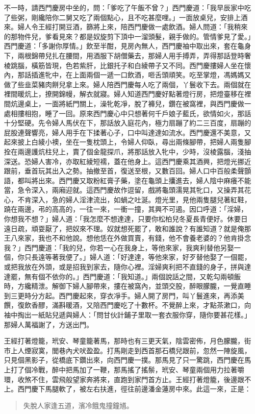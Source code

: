 不一時，請西門慶房中坐的，問：「爹吃了午飯不曾？」西門慶道：「我早辰家中吃了些粥，剛纔陪你二舅又吃了兩個點心，且不吃甚麼哩。」一面放桌兒，安排上酒來。婦人令王經打開豆酒，篩將上來，陪西門慶做一處飲酒。婦人問道：「我稍來的那物件兒，爹看見來？都是奴旋剪下頂中一溜頭髮，親手做的。管情爹見了愛。」西門慶道：「多謝你厚情。」飲至半酣，見房內無人，西門慶袖中取出來，套在龜身下，兩根錦帶兒扎在腰間，用酒服下胡僧藥去，那婦人用手搏弄，弄得那話登時奢棱跳腦，橫筋皆現，色若紫肝，比銀托子和白綾帶子又不同。西門慶摟婦人坐在懷內，那話插進牝中，在上面兩個一遞一口飲酒，咂舌頭頑笑。吃至掌燈，馮媽媽又做了些韭菜豬肉餅兒拿上來。婦人陪西門慶每人吃了兩個，丫鬟收下去。兩個就在裡間暖炕上，撩開錦幔，解衣就寢。婦人知道西門慶好點著燈行房，把燈臺移在裡間炕邊桌上，一面將紙門關上，澡牝乾凈，脫了褲兒，鑽在被窩裡，與西門慶做一處相摟相抱，睡了一回。原來西門慶心中只想著何千戶娘子藍氏，欲情如火，那話十分堅硬。先令婦人馬伏在下，那話放入庭花內，極力扇蹦了約二三百度，扇蹦的屁股連聲響亮，婦人用手在下揉著心子，口中叫達達如流水。西門慶還不美意，又起來披上白綾小襖，坐在一隻枕頭上，令婦人仰臥，尋出兩條腳帶，把婦人兩隻腳拴在兩邊護炕柱兒上，賣了個金龍探爪，將那話放入牝中，少時，沒棱露腦，淺抽深送。恐婦人害冷，亦取紅綾短襦，蓋在他身上。這西門慶乘其酒興，把燈光挪近跟前，垂首玩其出入之勢。抽撤至首，復送至根，又數百回。婦人口中百般柔聲顫語，都叫將出來。西門慶又取粉紅膏子藥，塗在龜頭上攮進去，婦人陰中麻癢不能當，急令深入，兩廂迎就。這西門慶故作逗留，戲將龜頭濡晃其牝口，又操弄其花心，不肯深入，急的婦人淫津流出，如蝸之吐涎。燈光里，見他兩隻腿兒著紅鞋，蹺在兩邊，弔的高高的，一往一來，一衝一撞，其興不可遏。因口呼道：「淫婦，你想我不想？」婦人道：「我怎麼不想達達，只要你松柏兒冬夏長青便好。休要日遠日疏，頑耍厭了，把奴來不理。奴就想死罷了，敢和誰說？有誰知道？就是俺那王八來家，我也不和他說。想他恁在外做買賣，有錢，他不會養老婆的？他肯掛念我？」西門慶道：「我的兒，你若一心在我身上，等他來家，我爽利替他另娶一個，你只長遠等著我便了。」婦人道：「好達達，等他來家，好歹替他娶了一個罷，或把我放在外頭，或是招我到家去，隨你心裡。淫婦爽利把不直錢的身子，拼與達達罷，無有個不依你的。」西門慶道：「我知道。」兩個說話之間，又乾勾兩頓飯時，方纔精泄。解御下婦人腳帶來，摟在被窩內，並頭交股，醉眼朦朧，一覺直睡到三更時分方起。西門慶起來，穿衣凈手。婦人開了房門，叫丫鬟進來，再添美饌，復飲香醪，滿斟暖酒，又陪西門慶吃了十數杯。不覺醉上來，才點茶漱口，向袖中掏出一紙貼兒遞與婦人：「問甘伙計鋪子里取一套衣服你穿，隨你要甚花樣。」那婦人萬福謝了，方送出門。

王經打著燈籠，玳安、琴童籠著馬，那時也有三更天氣，陰雲密佈，月色朦朧，街市上人煙寂寞，閭巷內犬吠盈盈。打馬剛走到西首那石橋兒跟前，忽然一陣旋風，只見個黑影子，從橋底下鑽出來，向西門慶一撲。那馬見了只一驚跳，西門慶在馬上打了個冷戰，醉中把馬加了一鞭，那馬搖了搖鬃，玳安、琴童兩個用力拉著嚼環，收煞不住，雲飛般望家奔將來，直跑到家門首方止。王經打著燈籠，後邊跟不上。西門慶下馬腿軟了，被左右扶進，徑往前邊潘金蓮房中來。此這一來，正是：
\begin{quote}
失脫人家逢五道，濱冷餓鬼撞鐘馗。
\end{quote}


